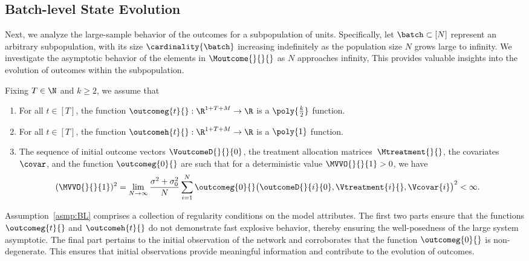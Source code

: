 \subsection{Batch-level State Evolution}
\label{apndx:batch_state_evolution}
% 
Next, we analyze the large-sample behavior of the outcomes for a subpopulation of units. Specifically, let $\batch \subset [N]$ represent an arbitrary subpopulation, with its size $\cardinality{\batch}$ increasing indefinitely as the population size $N$ grows large to infinity. We investigate the asymptotic behavior of the elements in $\Moutcome{}{}{}$ as $N$ approaches infinity, This provides valuable insights into the evolution of outcomes within the subpopulation.
% 
\begin{assumption}
    \label{asmp:BL}
    Fixing $T \in \N$ and $k \geq 2$, we assume that
    \begin{enumerate}[label=(\roman*)]
        \item \label{asmp:BL-pl functions} For all $t\in[T]$, the function $\outcomeg{t}{}:\R^{1+T+M}\rightarrow \R$ is a $\poly{\frac{k}{2}}$ function.

        \item \label{asmp:BL-pl h-functions} For all $t\in[T]$, the function $\outcomeh{t}{}:\R^{1+T+M}\rightarrow \R$ is a $\poly{1}$ function.

        \item \label{asmp:BL-bound on initials} The sequence of initial outcome vectors $\VoutcomeD{}{}{0}$, the treatment allocation matrices~$\Mtreatment{}{}$, the covariates $\covar$, and the function $\outcomeg{0}{}$ are such that for a deterministic value $\MVVO{}{}{1}>0$, we have
        \begin{align*}
            (\MVVO{}{}{1})^2
            &=
            \lim_{N\rightarrow \infty}
            \frac{\sigma^2+\sigma_0^2}{N} \sum_{i=1}^N
            \outcomeg{0}{}\big(
            \outcomeD{}{i}{0},\Vtreatment{i}{},\Vcovar{i}
            \big)^2 < \infty.
        \end{align*}
    \end{enumerate}
\end{assumption}
% 
Assumption~\ref{asmp:BL} comprises a collection of regularity conditions on the model attributes. The first two parts ensure that the functions $\outcomeg{t}{}$ and $\outcomeh{t}{}$ do not demonstrate fast explosive behavior, thereby ensuring the well-posedness of the large system asymptotic. The final part pertains to the initial observation of the network and corroborates that the function $\outcomeg{0}{}$ is non-degenerate. This ensures that initial observations provide meaningful information and contribute to the evolution of outcomes.
